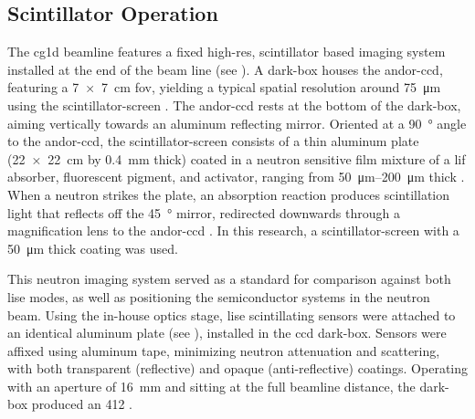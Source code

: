 \documentclass[../../../main.tex]{subfiles}
\begin{document}
%
    \subsection{Scintillator Operation}%
    \label{sec:chapter-3:beamline-testing:scintillator-operation}%
    The \gls{cg1d} \gls{beamline} features a fixed \gls{high-res}, scintillator based imaging system installed at the end of the beam line (see ).
    A \gls{dark-box} houses the \gls{andor-ccd}, featuring a \SI{7 x 7}{\centi\meter} \gls{fov}, yielding a typical spatial resolution around \SI{75}{\micro\meter} using the \gls{scintillator-screen} \cite{Santodonato_2015}.
    The \gls{andor-ccd} rests at the bottom of the \gls{dark-box}, aiming vertically towards an aluminum reflecting mirror.
    Oriented at a \SI{90}{\degree} angle to the \gls{andor-ccd}, the \gls{scintillator-screen} consists of a thin aluminum plate (\SI[product-units=power]{22 x 22}{\centi\meter} by \SI{0.4}{\milli\meter} thick) coated in a neutron sensitive film mixture of a \gls{lif} absorber,  fluorescent pigment, and  activator, ranging from \SIrange{50}{200}{\micro\meter} thick \cite{website:RC-TRITEC}.
    When a neutron strikes the plate, an absorption reaction produces scintillation light that reflects off the \SI{45}{\degree} mirror, redirected downwards through a magnification lens to the \gls{andor-ccd} \cite{Bilheux_2014}.
    In this research, a \gls{scintillator-screen} with a \SI{50}{\micro\meter} thick coating was used.    
    \par%
    This neutron imaging system served as a standard for comparison against both \gls{lise} modes, as well as positioning the semiconductor systems in the neutron beam.
    Using the in-house optics stage, \gls{lise} scintillating sensors were attached to an identical aluminum plate (see ), installed in the \gls{ccd} \gls{dark-box}.
    Sensors were affixed using aluminum tape, minimizing neutron attenuation and scattering, with both transparent (reflective) and opaque (anti-reflective) coatings.
    Operating with an aperture of  \SI{16}{\milli\meter} and sitting at the full \gls{beamline} distance, the \gls{dark-box} produced an  \num{412} \cite{Lukosi_2016a}.
\end{document}
